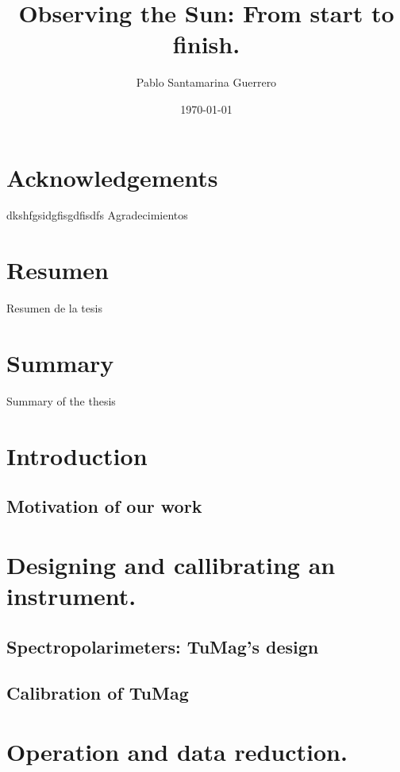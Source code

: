 \documentclass[12pt]{mythesis}
\title{Observing the Sun: From start to finish. }
\author{Pablo Santamarina Guerrero}
\date{\today}
\begin{document}
\frontmatter %
\maketitle
\cleardoublepage

\chapter*{Acknowledgements}
dkshfgsidgfisgdfisdfs
Agradecimientos

\chapter*{Resumen}

Resumen de la tesis

\chapter*{Summary}

Summary of the thesis

\tableofcontents

\mainmatter %
\chapter{Introduction}

\section{Motivation of our work}

\chapter{Designing and callibrating an instrument.}

\section{Spectropolarimeters: TuMag's design}
\section{Calibration of TuMag}

\chapter{Operation and data reduction.}
\end{document}
